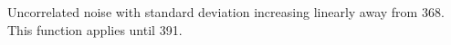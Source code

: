 Uncorrelated noise with standard deviation increasing linearly away from  368. This function applies until  391.
